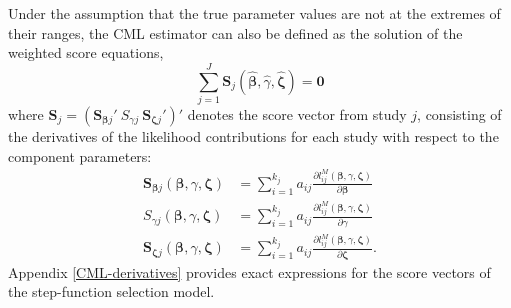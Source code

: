 \documentclass[
  american,
  man, donotrepeattitle,floatsintext]{apa7}
\begin{document}
Under the assumption that the true parameter values are not at the extremes of their ranges, the CML estimator can also be defined as the solution of the weighted score equations,
\begin{equation}
\sum_{j=1}^J \mathbf{S}_{j}\left(\boldsymbol{\hat\beta}, \hat\gamma, \boldsymbol{\hat\zeta}\right) = \mathbf{0}
\end{equation}
where \(\mathbf{S}_j = \left(\mathbf{S}_{\boldsymbol\beta j}' \  S_{\gamma j} \ \mathbf{S}_{\boldsymbol\zeta j}'\right)'\) denotes the score vector from study \(j\), consisting of the derivatives of the likelihood contributions for each study with respect to the component parameters:
\begin{align}
\mathbf{S}_{\boldsymbol\beta j}\left(\boldsymbol{\beta}, \gamma, \boldsymbol{\zeta}\right) &= \sum_{i=1}^{k_j} a_{ij} \frac{\partial l^M_{ij}\left(\boldsymbol\beta, \gamma, \boldsymbol\zeta\right)}{\partial \boldsymbol\beta} \label{eq:score-M-beta} \\
S_{\gamma j}\left(\boldsymbol{\beta}, \gamma, \boldsymbol{\zeta}\right) &= \sum_{i=1}^{k_j} a_{ij} \frac{\partial l^M_{ij}\left(\boldsymbol\beta, \gamma, \boldsymbol\zeta\right)}{\partial \gamma} \label{eq:score-M-gamma} \\
\mathbf{S}_{\boldsymbol\zeta j}\left(\boldsymbol{\beta}, \gamma, \boldsymbol{\zeta}\right) &= \sum_{i=1}^{k_j} a_{ij} \frac{\partial l^M_{ij}\left(\boldsymbol\beta, \gamma, \boldsymbol\zeta\right)}{\partial \boldsymbol\zeta}. \label{eq:score-M-zeta} 
\end{align}
Appendix \ref{CML-derivatives} provides exact expressions for the score vectors of the step-function selection model.
\end{document}
